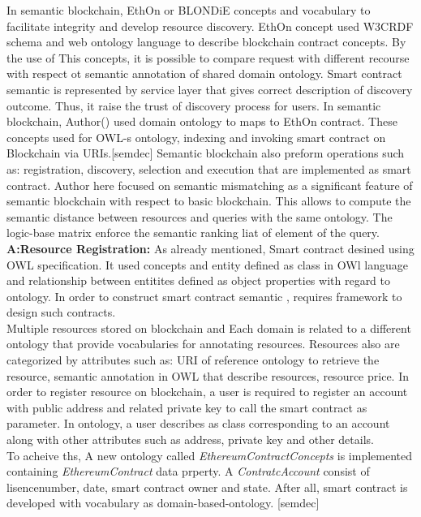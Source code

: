  In semantic blockchain, EthOn or BLONDiE concepts and vocabulary to facilitate integrity and develop resource discovery. EthOn concept used W3CRDF schema and web ontology language to describe blockchain contract concepts. By the use of This concepts, it is possible to compare request with different recourse with respect ot semantic annotation of shared domain ontology. 
 Smart contract semantic is represented by service layer that gives correct description of discovery outcome. Thus, it raise the trust of discovery process for users. In semantic blockchain, Author() used domain ontology to maps to EthOn contract. These concepts used for OWL-s ontology, indexing and invoking smart contract on Blockchain via URIs.[semdec] 
 Semantic blockchain also preform operations such as: registration, discovery, selection and execution that are implemented as smart contract. 
  Author here focused on semantic mismatching as a significant feature of semantic blockchain  with respect to basic blockchain.  This allows to compute the semantic distance between resources and queries with the same ontology.
 The logic-base matrix enforce the semantic ranking liat of element of the query. \\
 
 
 
 \textbf{A:Resource Registration:}
   As already mentioned, Smart contract desined using OWL specification. It used concepts and entity defined as class in OWl language and relationship between entitites defined as object properties with regard to ontology. In order to construct smart contract semantic , requires framework to design such contracts.\\
   Multiple resources stored on blockchain and Each domain is related to a different ontology that provide vocabularies for annotating resources. Resources also are categorized by attributes such as: URI of reference ontology to retrieve the resource, semantic annotation in OWL that describe resources, resource price.
   In order to register resource on blockchain, 
   a user is required to register an account with public address and related private key to call the smart contract as parameter. 
   In ontology, a user describes as class corresponding to an account along with other attributes such as address, private key and other details. \\
   To acheive ths, A new ontology called \textit{EthereumContractConcepts} is implemented containing \textit{EthereumContract} data prperty. A \textit{ContratcAccount}
consist of lisencenumber, date, smart contract owner and state.
 After all, smart contract is developed with vocabulary  as domain-based-ontology. [semdec]  
 
